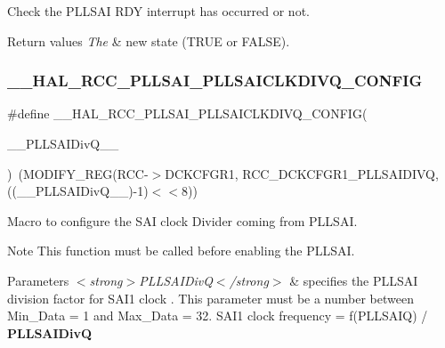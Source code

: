 Check the P\+L\+L\+S\+AI R\+DY interrupt has occurred or not. 


\begin{DoxyRetVals}{Return values}
{\em The} & new state (T\+R\+UE or F\+A\+L\+SE). \\
\hline
\end{DoxyRetVals}
\mbox{\label{group___r_c_c_ex___exported___macros_gad4fc19bc8f6c50dca02f9d0b14fc41fd}} 
\subsubsection{\texorpdfstring{\_\_HAL\_RCC\_PLLSAI\_PLLSAICLKDIVQ\_CONFIG}{\_\_HAL\_RCC\_PLLSAI\_PLLSAICLKDIVQ\_CONFIG}}
{\footnotesize\ttfamily \#define \+\_\+\+\_\+\+H\+A\+L\+\_\+\+R\+C\+C\+\_\+\+P\+L\+L\+S\+A\+I\+\_\+\+P\+L\+L\+S\+A\+I\+C\+L\+K\+D\+I\+V\+Q\+\_\+\+C\+O\+N\+F\+IG(\begin{DoxyParamCaption}\item[{}]{\+\_\+\+\_\+\+P\+L\+L\+S\+A\+I\+Div\+Q\+\_\+\+\_\+ }\end{DoxyParamCaption})~(M\+O\+D\+I\+F\+Y\+\_\+\+R\+EG(R\+CC-\/$>$D\+C\+K\+C\+F\+G\+R1, R\+C\+C\+\_\+\+D\+C\+K\+C\+F\+G\+R1\+\_\+\+P\+L\+L\+S\+A\+I\+D\+I\+VQ, ((\+\_\+\+\_\+\+P\+L\+L\+S\+A\+I\+Div\+Q\+\_\+\+\_\+)-\/1)$<$$<$8))}



Macro to configure the S\+AI clock Divider coming from P\+L\+L\+S\+AI. 

\begin{DoxyNote}{Note}
This function must be called before enabling the P\+L\+L\+S\+AI. 
\end{DoxyNote}

\begin{DoxyParams}{Parameters}
{\em $<$strong$>$\+P\+L\+L\+S\+A\+I\+Div\+Q$<$/strong$>$} & specifies the P\+L\+L\+S\+AI division factor for S\+A\+I1 clock . This parameter must be a number between Min\+\_\+\+Data = 1 and Max\+\_\+\+Data = 32. S\+A\+I1 clock frequency = f(\+P\+L\+L\+S\+A\+I\+Q) / {\bfseries{P\+L\+L\+S\+A\+I\+DivQ}} \\
\hline
\end{DoxyParams}
\mbox{\label{group___r_c_c_ex___exported___macros_ga57c7909a2eb8ee312705c224607d00c6}} 
